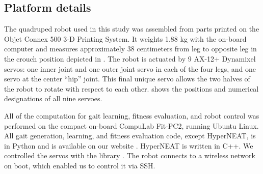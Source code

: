 \subsection{Platform details}






The quadruped robot used in this study was assembled from parts
printed on the Objet Connex 500 3-D Printing System. It weights 1.88
kg with the on-board computer and measures approximately 38
centimeters from leg to opposite leg in the crouch position depicted
in . The robot is actuated by 9 AX-12+
Dynamixel servos: one inner joint and one outer joint servo in each of
the four legs, and one servo at the center ``hip'' joint.  This final
unique servo allows the two halves of the robot to rotate with respect
to each other.  shows the positions and numerical
designations of all nine servoes.

All of the computation for gait learning, fitness evaluation, and robot control
was performed on the compact on-board CompuLab Fit-PC2, running Ubuntu
Linux.  All gait generation, learning, and fitness evaluation code,
except HyperNEAT, is in Python and is available on our website
\cite{quadraWeb}.  HyperNEAT is written in C++.  We controlled the servos with the  library \cite{pydynamixel}.  The robot
connects to a wireless network on boot, which enabled us to control it via SSH.




